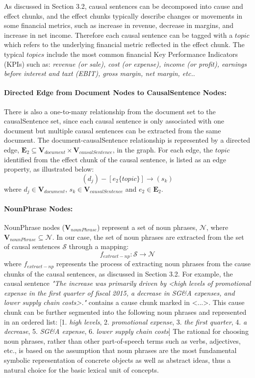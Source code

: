 As discussed in Section 3.2, causal sentences can be decomposed into cause and effect chunks, and the effect chunks typically describe changes or movements in some financial metrics, such as increase in revenue, decrease in margins, and increase in net income. Therefore each causal sentence can be tagged with a $topic$ which refers to the underlying financial metric reflected in the effect chunk. The typical $topics$ include the most common financial Key Performance Indicators (KPIs) such as: \emph{revenue (or sale), cost (or expense), income (or profit), earnings before interest and taxt (EBIT), gross margin, net margin, etc.}. 


\paragraph{Directed Edge from Document Nodes to CausalSentence Nodes:} There is also a one-to-many relationship from the document set to the causalSentence set, since each causal sentence is only associated with one document but multiple causal sentences can be extracted from the same document. The document-causalSentence relationship is represented by a directed edge, $\mathbf{E}_2 \subseteq \mathbf{V}_{document} \times \mathbf{V}_{causalSentence}$, in the graph. For each edge, the $topic$ identified from the effect chunk of the causal sentence, is listed as an edge property, as illustrated below:
\[( d_j ) - [ e_2 \{topic\} ]\rightarrow ( s_k ) \] 
where $d_j \in \mathbf{V}_{document}$, $s_k \in \mathbf{V}_{causalSentence}$ and $e_2 \in \mathbf{E}_2$.


\paragraph{NounPhrase Nodes:} NounPhrase nodes ($\mathbf{V}_{nounPhrase}$) represent a set of noun phrases, $\mathbf{\mathcal{N}}$, where $\mathbf{V}_{nounPhrase} \subseteq \mathcal{N}$. In our case, the set of noun phrases are extracted from the set of causal sentences $\mathbf{\mathcal{S}}$ through a mapping: 
\[f_{extract-np}: \mathbf{\mathcal{S}} \rightarrow \mathbf{\mathcal{N}}\] 
where $f_{extract-np}$ represents the process of extracting noun phrases from the cause chunks of the causal sentences, as discussed in Section 3.2. For example, the causal sentence \emph{"The increase was primarily driven by <high levels of promotional expense in the first quarter of fiscal 2015, a decrease in SG\&A expenses, and lower supply chain costs>."} contains a cause chunk marked in <...>. This cause chunk can be further segmented into the following noun phrases and represented in an ordered list:
[1. \emph{high levels}, 2. \emph{promotional expense}, 3. \emph{the first quarter}, 4. \emph{a decrease}, 5. \emph{SG\&A expense}, 6. \emph{lower supply chain costs}]
The rational for choosing noun phrases, rather than other part-of-speech terms such as verbs, adjectives, etc., is based on the assumption that noun phrases are the most fundamental symbolic representation of concrete objects as well as abstract ideas, thus a natural choice for the basic lexical unit of concepts.


